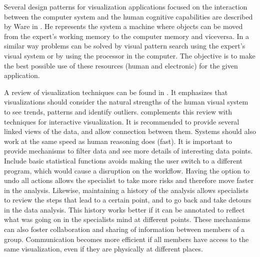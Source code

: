 Several design patterns for visualization applications focused on the interaction between the computer system and the human cognitive capabilities are described by Ware in \autocite{ware_visual_2013}. He represents the system a machine where objects can be moved from the expert's working memory to the computer memory and viceversa. In a similar way problems can be solved by visual pattern search using the expert's visual system or by using the processor in the computer. The objective is to make the best possible use of these resources (human and electronic) for the given application. 


A review of visualization techniques can be found in \autocite{heer_tour_2010}. It emphasizes that visualizations should consider the natural strengths of the human visual system to see trends, patterns and identify outliers. \autocite{heer_interactive_2012} complements this review with techniques for interactive visualization. It is recommended to provide several linked views of the data, and allow connection between them. Systems should also work at the same speed as human reasoning does (fast). It is important to provide mechanisms to filter data and see more details of interesting data points. Include basic statistical functions avoids making the user switch to a different program, which would cause a disruption on the workflow. Having the option to undo all actions allows the specialist to take more risks and therefore move faster in the analysis. Likewise, maintaining a history of the analysis allows specialists to review the steps that lead to a certain point, and to go back and take detours in the data analysis. This history works better if it can be annotated to reflect what was going on in the specialists mind at different points. These mechanisms can also foster collaboration and sharing of information between members of a group. Communication becomes more efficient if all members have access to the same visualization, even if they are physically at different places.








